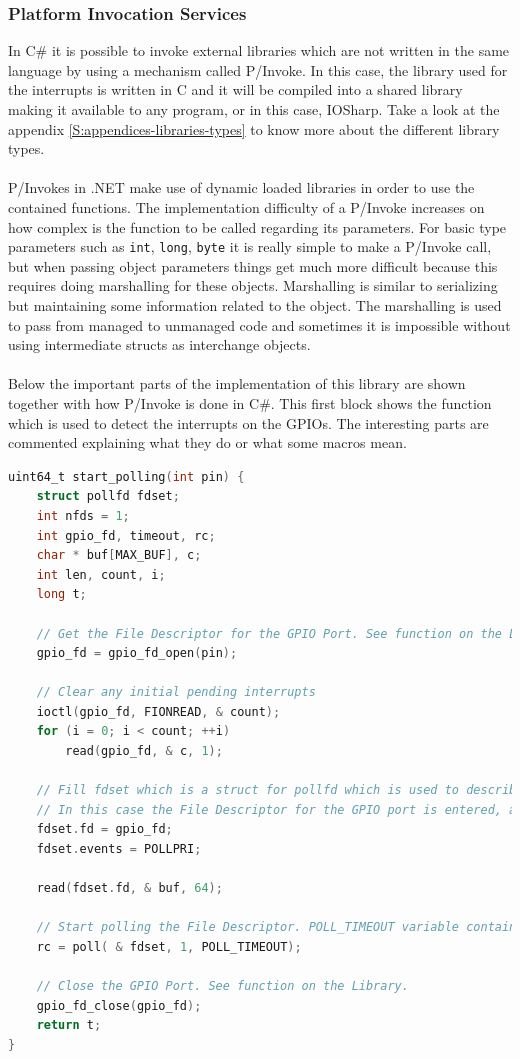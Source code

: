 \subsubsection{Platform Invocation Services}\label{SSS:IOSharp-Interrupt-PInvoke}
In C\# it is possible to invoke external libraries which are not written in the same language by using a mechanism called P/Invoke. In this case, the library used for the interrupts is written in C and it will be compiled into a shared library making it available to any program, or in this case, IOSharp. Take a look at the appendix \ref{S:appendices-libraries-types} to know more about the different library types.
\\
\\
P/Invokes in .NET make use of dynamic loaded libraries in order to use the contained functions. The implementation difficulty of a P/Invoke increases on how complex is the function to be called regarding its parameters. For basic type parameters such as \verb!int!, \verb!long!, \verb!byte! it is really simple to make a P/Invoke call, but when passing object parameters things get much more difficult because this requires doing marshalling for these objects. Marshalling is similar to serializing but maintaining some information related to the object. The marshalling is used to pass from managed to unmanaged code and sometimes it is impossible without using intermediate structs as interchange objects.
\\
\\
Below the important parts of the implementation of this library are shown together with how P/Invoke is done in C\#. This first block shows the function which is used to detect the interrupts on the GPIOs. The interesting parts are commented explaining what they do or what some macros mean.
\begin{lstlisting}[language=C, caption={IOSharp.c - Polling function}]
uint64_t start_polling(int pin) {
    struct pollfd fdset;
    int nfds = 1;
    int gpio_fd, timeout, rc;
    char * buf[MAX_BUF], c;
    int len, count, i;
    long t;

    // Get the File Descriptor for the GPIO Port. See function on the Library.
    gpio_fd = gpio_fd_open(pin);

    // Clear any initial pending interrupts
    ioctl(gpio_fd, FIONREAD, & count);
    for (i = 0; i < count; ++i)
        read(gpio_fd, & c, 1);

    // Fill fdset which is a struct for pollfd which is used to describe the polling system.
    // In this case the File Descriptor for the GPIO port is entered, and then the POLLPRI (Data Urgent to Read) is configured as the event type.
    fdset.fd = gpio_fd;
    fdset.events = POLLPRI;

    read(fdset.fd, & buf, 64);

    // Start polling the File Descriptor. POLL_TIMEOUT variable contains (-1) which stands for infinite blocking until event.
    rc = poll( & fdset, 1, POLL_TIMEOUT);

    // Close the GPIO Port. See function on the Library.
    gpio_fd_close(gpio_fd);
    return t;
}
\end{lstlisting}
